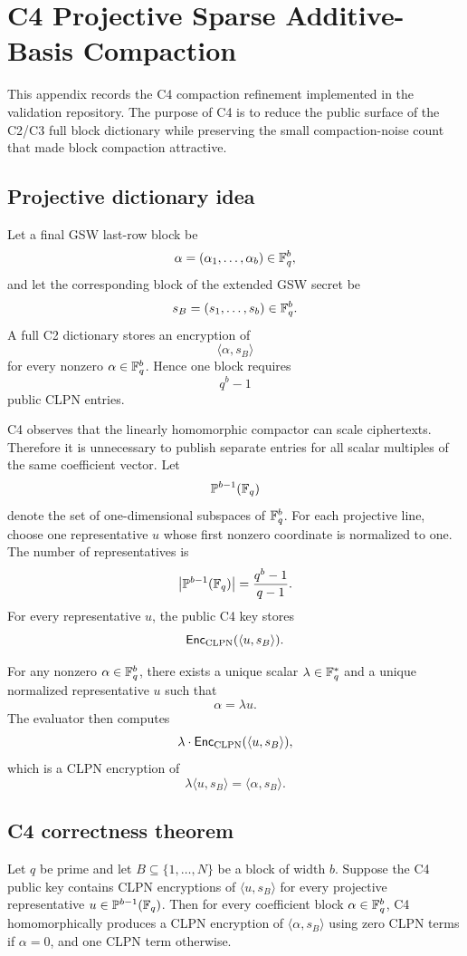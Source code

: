 \section{C4 Projective Sparse Additive-Basis Compaction}
\label{app:c4-projective}

This appendix records the C4 compaction refinement implemented in the validation repository.  The purpose of C4 is to reduce the public surface of the C2/C3 full block dictionary while preserving the small compaction-noise count that made block compaction attractive.

\subsection{Projective dictionary idea}

Let a final GSW last-row block be
\[
  \alpha = (\alpha_1,\ldots,\alpha_b) \in \mathbb{F}_q^b,
\]
and let the corresponding block of the extended GSW secret be
\[
  s_B = (s_1,\ldots,s_b) \in \mathbb{F}_q^b.
\]
A full C2 dictionary stores an encryption of
\[
  \langle \alpha,s_B\rangle
\]
for every nonzero \(\alpha\in\mathbb{F}_q^b\).  Hence one block requires
\[
  q^b-1
\]
public CLPN entries.

C4 observes that the linearly homomorphic compactor can scale ciphertexts.  Therefore it is unnecessary to publish separate entries for all scalar multiples of the same coefficient vector.  Let
\[
  \mathbb P^{b-1}(\mathbb{F}_q)
\]
denote the set of one-dimensional subspaces of \(\mathbb{F}_q^b\).  For each projective line, choose one representative \(u\) whose first nonzero coordinate is normalized to one.  The number of representatives is
\[
  \left|\mathbb P^{b-1}(\mathbb{F}_q)\right|
  = \frac{q^b-1}{q-1}.
\]
For every representative \(u\), the public C4 key stores
\[
  \mathsf{Enc}_{\mathrm{CLPN}}(\langle u,s_B\rangle).
\]

For any nonzero \(\alpha\in\mathbb{F}_q^b\), there exists a unique scalar \(\lambda\in\mathbb{F}_q^\ast\) and a unique normalized representative \(u\) such that
\[
  \alpha = \lambda u.
\]
The evaluator then computes
\[
  \lambda\cdot \mathsf{Enc}_{\mathrm{CLPN}}(\langle u,s_B\rangle),
\]
which is a CLPN encryption of
\[
  \lambda\langle u,s_B\rangle = \langle \alpha,s_B\rangle.
\]

\subsection{C4 correctness theorem}

\begin{theorem}
Let \(q\) be prime and let \(B\subseteq\{1,\ldots,N\}\) be a block of width \(b\).  Suppose the C4 public key contains CLPN encryptions of \(\langle u,s_B\rangle\) for every projective representative \(u\in\mathbb P^{b-1}(\mathbb{F}_q)\).  Then for every coefficient block \(\alpha\in\mathbb{F}_q^b\), C4 homomorphically produces a CLPN encryption of \(\langle \alpha,s_B\rangle\) using zero CLPN terms if \(\alpha=0\), and one CLPN term otherwise.
\end{theorem}

